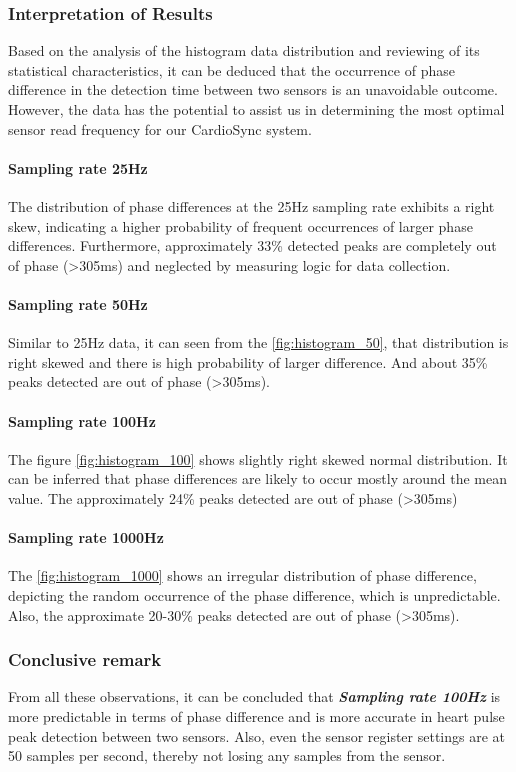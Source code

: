 \subsubsection{Interpretation of Results}
Based on the analysis of the histogram data distribution and reviewing of its statistical characteristics, it can be deduced that the occurrence of phase difference in the detection time between two sensors is an unavoidable outcome. However, the data has the potential to assist us in determining the most optimal sensor read frequency for our CardioSync system.

\paragraph{Sampling rate 25Hz}
The distribution of phase differences at the 25Hz sampling rate exhibits a right skew, indicating a higher probability of frequent occurrences of larger phase differences. Furthermore, approximately 33\% detected peaks are completely out of phase (>305ms) and neglected by measuring logic for data collection.

\paragraph{Sampling rate 50Hz}
Similar to 25Hz data, it can seen from the \autoref{fig:histogram_50}, that distribution is right skewed and there is high probability of larger difference. And about 35\% peaks detected are out of phase (>305ms). 

\paragraph{Sampling rate 100Hz}
The figure \ref{fig:histogram_100} shows slightly right skewed normal distribution. It can be inferred that phase differences are likely to occur mostly around the mean value. The approximately 24\% peaks detected are out of phase (>305ms)  

\paragraph{Sampling rate 1000Hz}
The \autoref{fig:histogram_1000} shows an irregular distribution of phase difference, depicting the random occurrence of the phase difference, which is unpredictable. Also, the approximate 20-30\% peaks detected are out of phase (>305ms).

\subsubsection{Conclusive remark}
From all these observations, it can be concluded that \textbf{\textit{Sampling rate 100Hz}} is more predictable in terms of phase difference and is more accurate in heart pulse peak detection between two sensors. Also, even the sensor register settings are at 50 samples per second, thereby not losing any samples from the sensor.

